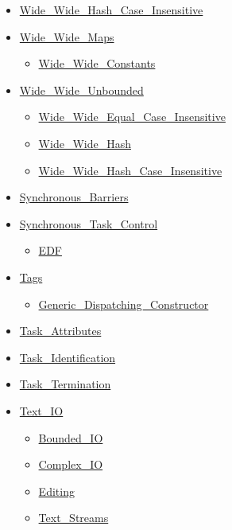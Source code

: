 \begin{multicols*}{\columnnr}
\begin{scriptsize}
\begin{itemize}[leftmargin=0mm]
\begin{itemize}[leftmargin=5mm]
\begin{itemize}[leftmargin=5mm]
	\item[] \href{\adarmlink{RM-A-4-8.html}}{Wide\_Wide\_Hash\_Case\_Insensitive}
	\item[] \href{\adarmlink{RM-A-4-8.html}}{Wide\_Wide\_Maps}
	  \begin{itemize}[leftmargin=5mm]
	  \item[] \href{\adarmlink{RM-A-4-8.html}}{Wide\_Wide\_Constants}
	  \end{itemize}
	\item[] \href{\adarmlink{RM-A-4-8.html}}{Wide\_Wide\_Unbounded}
	  \begin{itemize}[leftmargin=5mm]
	  \item[] \href{\adarmlink{RM-A-4-8.html}}{Wide\_Wide\_Equal\_Case\_Insensitive}
	  \item[] \href{\adarmlink{RM-A-4-8.html}}{Wide\_Wide\_Hash}
	  \item[] \href{\adarmlink{RM-A-4-8.html}}{Wide\_Wide\_Hash\_Case\_Insensitive}
	  \end{itemize}
	\item[] \href{\adarmlink{RM-D-10-1.html}}{Synchronous\_Barriers}
	\item[] \href{\adarmlink{RM-D-10.html}}{Synchronous\_Task\_Control}
	  \begin{itemize}[leftmargin=5mm]
	  \item[] \href{\adarmlink{RM-D-10.html}}{EDF}
	  \end{itemize}
	\item[] \href{\adarmlink{RM-3-9.html}}{Tags}
	  \begin{itemize}[leftmargin=5mm]
	  \item[] \href{\adarmlink{RM-3-9.html}}{Generic\_Dispatching\_Constructor}
	  \end{itemize}
	\item[] \href{\adarmlink{RM-C-7-2.html}}{Task\_Attributes}
	\item[] \href{\adarmlink{RM-C-7-1.html}}{Task\_Identification}
	\item[] \href{\adarmlink{RM-C-7-3.html}}{Task\_Termination}
	\item[] \href{\adarmlink{RM-A-10-1.html}}{Text\_IO}
	  \begin{itemize}[leftmargin=5mm]
	  \item[] \href{\adarmlink{RM-A-10-11.html}}{Bounded\_IO}
	  \item[] \href{\adarmlink{RM-G-1-3.html}}{Complex\_IO}
	  \item[] \href{\adarmlink{RM-F-3-3.html}}{Editing}
	  \item[] \href{\adarmlink{RM-A-12-2.html}}{Text\_Streams}

\end{itemize}
\end{itemize}
\end{itemize}
\end{itemize}
\end{scriptsize}
\end{multicols*}
